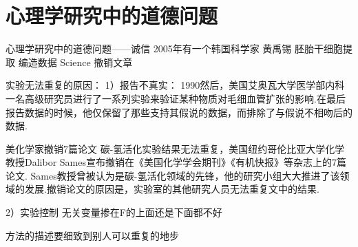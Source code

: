 \section{心理学研究中的道德问题}

心理学研究中的道德问题——诚信
2005年有一个韩国科学家 黄禹锡 胚胎干细胞提取 编造数据 Science 撤销文章

实验无法重复的原因：
1）报告不真实：
1990然后，美国艾奥瓦大学医学部内科一名高级研究员进行了一系列实验来验证某种物质对毛细血管扩张的影响.在最后报告数据的时候，他仅保留了那些支持其假说的数据，而排除了与假说不相吻后的数据.

美化学家撤销7篇论文
碳-氢活化实验结果无法重复，美国纽约哥伦比亚大学化学教授Dalibor Sames宣布撤销在《美国化学学会期刊》《有机快报》等杂志上的7篇论文. Sames教授曾被认为是碳-氢活化领域的先锋，他的研究小组大大推进了该领域的发展.撤销论文的原因是，实验室的其他研究人员无法重复文中的结果.

2）实验控制
无关变量掺在F的上面还是下面都不好

方法的描述要细致到别人可以重复的地步